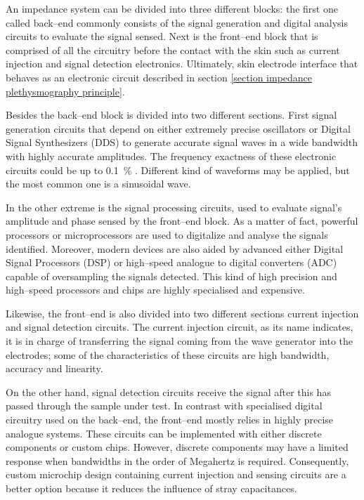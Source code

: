 An impedance system can be divided into three different blocks: the first one called back–end commonly consists of the signal generation and digital analysis circuits to evaluate the signal sensed. Next is the front–end block that is comprised of all the circuitry before the contact with the skin such as current injection and signal detection electronics. Ultimately, skin electrode interface that behaves as an electronic circuit described in section \ref{section impedance plethysmography principle}. 

Besides the back–end block is divided into two different sections. First signal generation circuits that depend on either extremely precise oscillators or Digital Signal Synthesizers (DDS) to generate accurate signal waves in a wide bandwidth with highly accurate amplitudes. The frequency exactness of these electronic circuits could be up to \SI{0.1}{\percent} \cite{ad:AD5930}.  Different kind of waveforms may be applied, but the most common one is a sinusoidal wave. 

In the other extreme is the signal processing circuits, used to evaluate signal’s amplitude and phase sensed by the front–end block.  As a matter of fact, powerful processors or microprocessors are used to digitalize and analyse the signals identified. Moreover, modern devices are also aided by advanced either Digital Signal Processors (DSP) or high–speed analogue to digital converters (ADC) capable of oversampling the signals detected. This kind of high precision and high–speed processors and chips are highly specialised and expensive.

Likewise, the front–end is also divided into two different sections current injection and signal detection circuits. The current injection circuit, as its name indicates, it is in charge of transferring the signal coming from the wave generator into the electrodes; some of the characteristics of these circuits are high bandwidth, accuracy and linearity. 

On the other hand, signal detection circuits receive the signal after this has passed through the sample under test. In contrast with specialised digital circuitry used on the back–end, the front–end mostly relies in highly precise analogue systems. These circuits can be implemented with either discrete components or custom chips. However, discrete components may have a limited response when bandwidths in the order of Megahertz is required. Consequently, custom microchip design containing current injection and sensing circuits are a better option because it reduces the influence of stray capacitances. 

